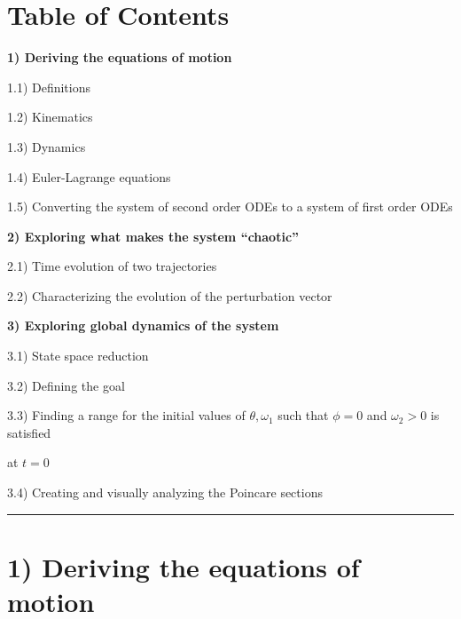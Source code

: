 \documentclass[12pt]{article}
\begin{document}
\section*{Table of Contents}
\textbf{1) Deriving the equations of motion} \par
\hspace{1cm} 1.1) Definitions \par
\hspace{1cm} 1.2) Kinematics \par
\hspace{1cm} 1.3) Dynamics \par
\hspace{1cm} 1.4) Euler-Lagrange equations \par
\hspace{1cm} 1.5) Converting the system of second order ODEs to a system of first order ODEs \par
\vspace{0.5cm}

\textbf{2) Exploring what makes the system ``chaotic''} \par
\hspace{1cm} 2.1) Time evolution of two trajectories \par
\hspace{1cm} 2.2) Characterizing the evolution of the perturbation vector \par
\vspace{0.5cm}

\textbf{3) Exploring global dynamics of the system} \par
\hspace{1cm} 3.1) State space reduction \par
\hspace{1cm} 3.2) Defining the goal \par
\hspace{1cm} 3.3) Finding a range for the initial values of \ensuremath{\theta,\omega_1} such that \ensuremath{\phi=0} and \ensuremath{\omega_2>0} is satisfied \par
\hspace{1.9cm} at \ensuremath{t=0} \par
\hspace{1cm} 3.4) Creating and visually analyzing the Poincare sections \par
\vspace{1cm}

\hrule
\vspace{1cm}

\section*{1) Deriving the equations of motion}
\end{document}
